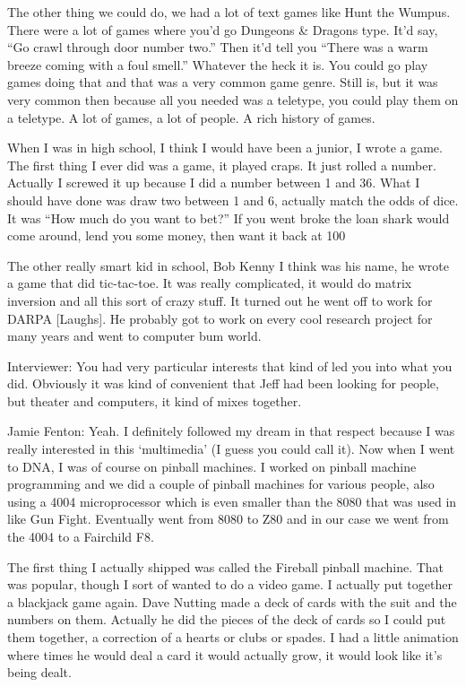 The other thing we could do, we had a lot of text games like Hunt the Wumpus. There were a lot of games where you’d go Dungeons \& Dragons type. It’d say, “Go crawl through door number two.” Then it’d tell you “There was a warm breeze coming with a foul smell.” Whatever the heck it is. You could go play games doing that and that was a very common game genre. Still is, but it was very common then because all you needed was a teletype, you could play them on a teletype. A lot of games, a lot of people. A rich history of games.

When I was in high school, I think I would have been a junior, I wrote a game. The first thing I ever did was a game, it played craps. It just rolled a number. Actually I screwed it up because I did a number between 1 and 36. What I should have done was draw two between 1 and 6, actually match the odds of dice. It was “How much do you want to bet?” If you went broke the loan shark would come around, lend you some money, then want it back at 100%

The other really smart kid in school, Bob Kenny I think was his name, he wrote a game that did tic-tac-toe. It was really complicated, it would do matrix inversion and all this sort of crazy stuff. It turned out he went off to work for DARPA [Laughs]. He probably got to work on every cool research project for many years and went to computer bum world.

\textcolor{interviewer}{Interviewer:} You had very particular interests that kind of led you into what you did. Obviously it was kind of convenient that Jeff had been looking for people, but theater and computers, it kind of mixes together.

\textcolor{interviewee}{Jamie Fenton:} Yeah. I definitely followed my dream in that respect because I was really interested in this ‘multimedia’ (I guess you could call it). Now when I went to DNA, I was of course on pinball machines. I worked on pinball machine programming and we did a couple of pinball machines for various people, also using a 4004 microprocessor which is even smaller than the 8080 that was used in like Gun Fight. Eventually went from 8080 to Z80 and in our case we went from the 4004 to a Fairchild F8.

The first thing I actually shipped was called the Fireball pinball machine. That was popular, though I sort of wanted to do a video game. I actually put together a blackjack game again. Dave Nutting made a deck of cards with the suit and the numbers on them. Actually he did the pieces of the deck of cards so I could put them together, a correction of a hearts or clubs or spades. I had a little animation where times he would deal a card it would actually grow, it would look like it’s being dealt.

